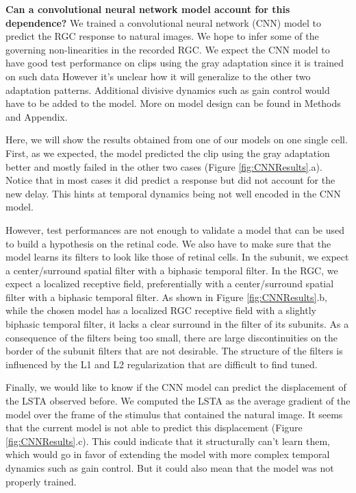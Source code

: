 \textbf{Can a convolutional neural network model account for this dependence?}
We trained a convolutional neural network (CNN) model to predict the RGC
response to natural images. We hope to infer some of the governing
non-linearities in the recorded RGC. We expect the CNN model to have
good test performance on clips using the gray adaptation since it is trained on
such data However it's unclear how it will generalize to the other two
adaptation patterns. Additional divisive dynamics such as gain control would
have to be added to the model. More on model design can be found in Methods and
Appendix.

Here, we will show the results obtained from one of our models on one single
cell.
First, as we expected, the model predicted the clip using the gray adaptation
better and mostly failed in the other two cases (Figure
\ref{fig:CNNResults}.a). Notice that in most cases it
did predict a response but did not account for the new delay.
This hints at temporal dynamics being not well encoded in the CNN model.

However, test performances are not enough to validate a model that can be used
to build a hypothesis on the retinal code. We also have to make sure that the
model learns its filters to look like those of retinal cells. In the subunit,
we expect a center/surround spatial filter with a biphasic temporal filter. In
the RGC, we expect a localized receptive field, preferentially with a
center/surround spatial filter with a biphasic temporal filter. As shown in
Figure \ref{fig:CNNResults}.b, while the chosen model has a localized RGC
receptive field
with a slightly biphasic temporal filter, it lacks a clear surround in the
filter
of its subunits. As a consequence of the filters being too small, there are
large discontinuities on the border of the subunit filters that are not
desirable.
The structure of the filters is influenced by the L1 and L2 regularization that
are difficult to find tuned.

Finally, we would like to know if the CNN model can predict the displacement of
the LSTA observed before. We computed the LSTA as the average gradient of the
model over the frame of the stimulus that contained the natural image. It seems
that the current model is not able to predict this displacement (Figure
\ref{fig:CNNResults}.c). This could
indicate that it structurally can't learn them, which would go in favor of
extending the model with more complex temporal dynamics such as gain control.
But it could also mean that the model was not properly trained.

